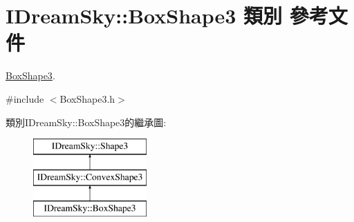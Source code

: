 \hypertarget{class_i_dream_sky_1_1_box_shape3}{}\section{I\+Dream\+Sky\+:\+:Box\+Shape3 類別 參考文件}
\label{class_i_dream_sky_1_1_box_shape3}


\hyperlink{class_i_dream_sky_1_1_box_shape3}{Box\+Shape3}.  




{\ttfamily \#include $<$Box\+Shape3.\+h$>$}

類別\+I\+Dream\+Sky\+:\+:Box\+Shape3的繼承圖\+:\begin{figure}[H]
\begin{center}
\leavevmode
\includegraphics[height=3.000000cm]{class_i_dream_sky_1_1_box_shape3}
\end{center}
\end{figure}
